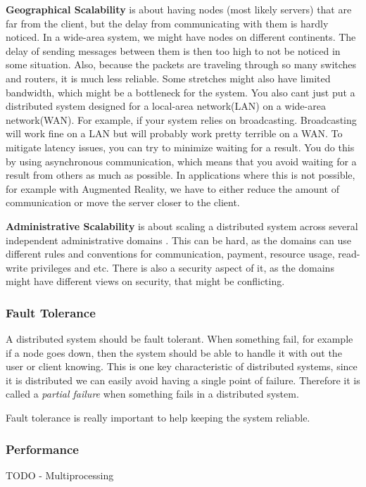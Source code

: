 \textbf{Geographical Scalability} is about having nodes (most likely servers) that are far from the client, but the delay from communicating with them is hardly noticed. In a wide-area system, we might have nodes on different continents. The delay of sending messages between them is then too high to not be noticed in some situation. Also, because the packets are traveling through so many switches and routers, it is much less reliable. Some stretches might also have limited bandwidth, which might be a bottleneck for the system. You also cant just put a distributed system designed for a local-area network(LAN) on a wide-area network(WAN). For example, if your system relies on broadcasting. Broadcasting will work fine on a LAN but will probably work pretty terrible on a WAN. To mitigate latency issues, you can try to minimize waiting for a result. You do this by using asynchronous communication, which means that you avoid waiting for a result from others as much as possible. In applications where this is not possible, for example with Augmented Reality, we have to either reduce the amount of communication or move the server closer to the client.

\textbf{Administrative Scalability} is about scaling a distributed system across several independent administrative domains \cite{steen_distributed_2017}. This can be hard, as the domains can use different rules and conventions for communication, payment, resource usage, read-write privileges and etc. There is also a security aspect of it, as the domains might have different views on security, that might be conflicting. 



\subsubsection{Fault Tolerance}
A distributed system should be fault tolerant. When something fail, for example if a node goes down, then the system should be able to handle it with out the user or client knowing. This is one key characteristic of distributed systems, since it is distributed we can easily avoid having a single point of failure. Therefore it is called a \textit{partial failure}\cite{steen_distributed_2017} when something fails in a distributed system.


Fault tolerance is really important to help keeping the system reliable. 

\subsubsection{Performance}
TODO
- Multiprocessing

